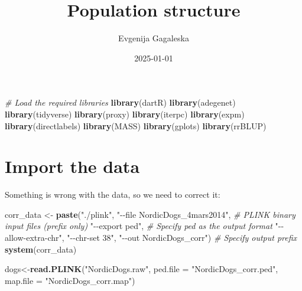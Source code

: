 \documentclass[
]{article}
\title{Population structure}
\author{Evgenija Gagaleska}
\date{2025-01-01}
\newenvironment{Shaded}{\begin{snugshade}}{\end{snugshade}}
\newcommand{\AttributeTok}[1]{\textcolor[rgb]{0.13,0.29,0.53}{#1}}
\newcommand{\CommentTok}[1]{\textcolor[rgb]{0.56,0.35,0.01}{\textit{#1}}}
\newcommand{\FunctionTok}[1]{\textcolor[rgb]{0.13,0.29,0.53}{\textbf{#1}}}
\newcommand{\NormalTok}[1]{#1}
\newcommand{\OtherTok}[1]{\textcolor[rgb]{0.56,0.35,0.01}{#1}}
\newcommand{\StringTok}[1]{\textcolor[rgb]{0.31,0.60,0.02}{#1}}
\begin{document}
\maketitle

\begin{Shaded}
\begin{Highlighting}[]
\CommentTok{\# Load the required libraries}
\FunctionTok{library}\NormalTok{(dartR)}
\FunctionTok{library}\NormalTok{(adegenet)}
\FunctionTok{library}\NormalTok{(tidyverse)}
\FunctionTok{library}\NormalTok{(proxy)}
\FunctionTok{library}\NormalTok{(iterpc)}
\FunctionTok{library}\NormalTok{(expm)}
\FunctionTok{library}\NormalTok{(directlabels)}
\FunctionTok{library}\NormalTok{(MASS)}
\FunctionTok{library}\NormalTok{(gplots)}
\FunctionTok{library}\NormalTok{(rrBLUP)}
\end{Highlighting}
\end{Shaded}

\section{Import the data}\label{import-the-data}

Something is wrong with the data, so we need to correct it:

\begin{Shaded}
\begin{Highlighting}[]
\NormalTok{corr\_data }\OtherTok{\textless{}{-}} \FunctionTok{paste}\NormalTok{(}\StringTok{"./plink"}\NormalTok{,}
                   \StringTok{"{-}{-}file NordicDogs\_4mars2014"}\NormalTok{,                }\CommentTok{\# PLINK binary input files (prefix only)}
                   \StringTok{"{-}{-}export ped"}\NormalTok{,                 }\CommentTok{\# Specify \textquotesingle{}ped\textquotesingle{} as the output format}
                   \StringTok{"{-}{-}allow{-}extra{-}chr"}\NormalTok{,}
                   \StringTok{"{-}{-}chr{-}set 38"}\NormalTok{,}
                   \StringTok{"{-}{-}out NordicDogs\_corr"}\NormalTok{)        }\CommentTok{\# Specify output prefix}
\FunctionTok{system}\NormalTok{(corr\_data)}
\end{Highlighting}
\end{Shaded}

\begin{Shaded}
\begin{Highlighting}[]
\NormalTok{dogs}\OtherTok{\textless{}{-}}\FunctionTok{read.PLINK}\NormalTok{(}\StringTok{"NordicDogs.raw"}\NormalTok{, }\AttributeTok{ped.file =} \StringTok{"NordicDogs\_corr.ped"}\NormalTok{, }\AttributeTok{map.file =} \StringTok{"NordicDogs\_corr.map"}\NormalTok{)}
\end{Highlighting}
\end{Shaded}
\end{document}
